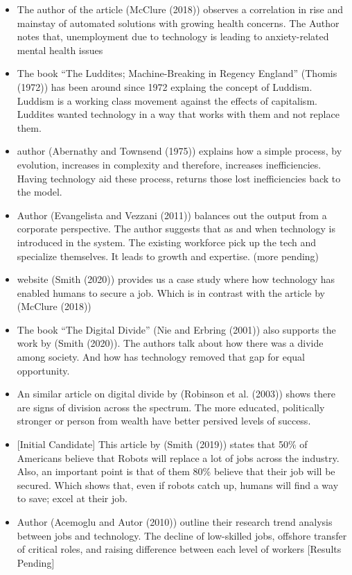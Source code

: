 \documentclass[
  english,
  man]{apa7}
\begin{document}
\begin{itemize}
\item
  The author of the article (McClure (2018)) observes a correlation in rise and mainstay of automated solutions with growing health concerns. The Author notes that, unemployment due to technology is leading to anxiety-related mental health issues
\item
  The book ``The Luddites; Machine-Breaking in Regency England'' (Thomis (1972)) has been around since 1972 explaing the concept of Luddism. Luddism is a working class movement against the effects of capitalism. Luddites wanted technology in a way that works with them and not replace them.
\item
  author (Abernathy and Townsend (1975)) explains how a simple process, by evolution, increases in complexity and therefore, increases inefficiencies. Having technology aid these process, returns those lost inefficiencies back to the model.
\item
  Author (Evangelista and Vezzani (2011)) balances out the output from a corporate perspective. The author suggests that as and when technology is introduced in the system. The existing workforce pick up the tech and specialize themselves. It leads to growth and expertise. (more pending)
\item
  website (Smith (2020)) provides us a case study where how technology has enabled humans to secure a job. Which is in contrast with the article by (McClure (2018))
\item
  The book ``The Digital Divide'' (Nie and Erbring (2001)) also supports the work by (Smith (2020)). The authors talk about how there was a divide among society. And how has technology removed that gap for equal opportunity.
\item
  An similar article on digital divide by (Robinson et al. (2003)) shows there are signs of division across the spectrum. The more educated, politically stronger or person from wealth have better persived levels of success.
\item
  {[}Initial Candidate{]} This article by (Smith (2019)) states that 50\% of Americans believe that Robots will replace a lot of jobs across the industry. Also, an important point is that of them 80\% believe that their job will be secured. Which shows that, even if robots catch up, humans will find a way to save; excel at their job.
\item
  Author (Acemoglu and Autor (2010)) outline their research trend analysis between jobs and technology. The decline of low-skilled jobs, offshore transfer of critical roles, and raising difference between each level of workers {[}Results Pending{]}

\end{itemize}
\end{document}
